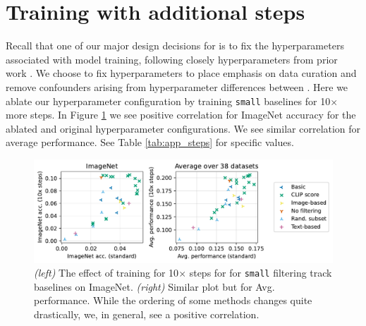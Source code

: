 \section{Training with additional steps}
\label{app:steps}
Recall that one of our major design decisions for \datanet is to fix the hyperparameters associated with model training, following closely hyperparameters from prior work \cite{radford2021learning}. We choose to fix hyperparameters to place emphasis on data curation and remove confounders arising from hyperparameter differences between \users. Here we ablate our hyperparameter configuration by training {\small \texttt{small}} baselines for 10$\times$ more steps. In Figure \ref{fig:steps} we see positive correlation for ImageNet accuracy for the ablated and original hyperparameter configurations. We see similar correlation for average performance. See Table \ref{tab:app_steps} for specific values.

\begin{figure}
    \centering
    \includegraphics[width=.9\textwidth]{figures/appx-steps.pdf}
    \caption{\emph{(left)} The effect of training for 10$\times$ steps for for {\small \texttt{small}} filtering track baselines on ImageNet. \emph{(right)} Similar plot but for Avg. performance. While the ordering of some methods changes quite drastically, we, in general, see a positive correlation.}
    \label{fig:steps}
\end{figure}

